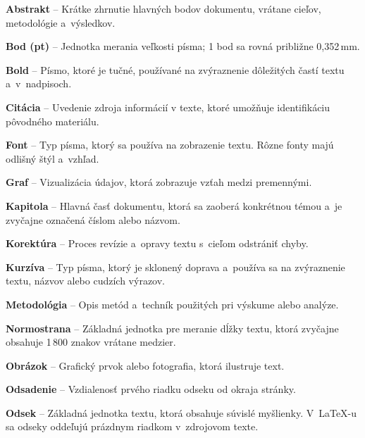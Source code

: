 \begin{trivlist}
  \item{\textbf{Abstrakt}} -- Krátke zhrnutie hlavných bodov dokumentu, vrátane cieľov, metodológie a~výsledkov.

  \item{\textbf{Bod (pt)}} -- Jednotka merania veľkosti písma; 1 bod sa rovná približne 0,352\,mm.
  
  \item{\textbf{Bold}} -- Písmo, ktoré je tučné, používané na zvýraznenie dôležitých častí textu a~v~nadpisoch.
  
  \item{\textbf{Citácia}} -- Uvedenie zdroja informácií v texte, ktoré umožňuje identifikáciu pôvodného materiálu.
  
  \item{\textbf{Font}} -- Typ písma, ktorý sa používa na zobrazenie textu. Rôzne fonty majú odlišný štýl a~vzhľad.
  
  \item{\textbf{Graf}} -- Vizualizácia údajov, ktorá zobrazuje vzťah medzi premennými.
  
  \item{\textbf{Kapitola}} -- Hlavná časť dokumentu, ktorá sa zaoberá konkrétnou témou a~je zvyčajne označená číslom alebo názvom.
  
  \item{\textbf{Korektúra}} -- Proces revízie a~opravy textu s~cieľom odstrániť chyby.
  
  \item{\textbf{Kurzíva}} -- Typ písma, ktorý je sklonený doprava a~používa sa na zvýraznenie textu, názvov alebo cudzích výrazov.
  
  \item{\textbf{Metodológia}} -- Opis metód a~techník použitých pri výskume alebo analýze.
  
  \item{\textbf{Normostrana}} -- Základná jednotka pre meranie dĺžky textu, ktorá zvyčajne obsahuje 1\,800 znakov vrátane medzier.
  
  \item{\textbf{Obrázok}} -- Grafický prvok alebo fotografia, ktorá ilustruje text.
  
  \item{\textbf{Odsadenie}} -- Vzdialenosť prvého riadku odseku od okraja stránky.
  
  \item{\textbf{Odsek}} -- Základná jednotka textu, ktorá obsahuje súvislé myšlienky. V~\LaTeX-u sa odseky oddeľujú prázdnym riadkom v~zdrojovom texte.
  

\end{trivlist}
